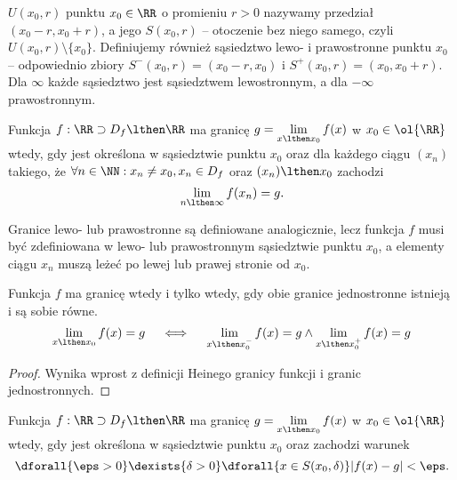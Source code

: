  $U(x_0, r)$ punktu $x_0 \in \RR$ o promieniu $r > 0$ nazywamy przedział $(x_0 - r, x_0 + r)$, a jego  $S(x_0, r)$ -- otoczenie bez niego samego, czyli $U(x_0, r) \setminus \{x_0\}$. Definiujemy również sąsiedztwo lewo- i prawostronne punktu $x_0$ -- odpowiednio zbiory $S^-(x_0, r) = (x_0 - r, x_0)$ i $S^+(x_0, r) = (x_0, x_0 + r)$. Dla $\infty$ każde sąsiedztwo jest sąsiedztwem lewostronnym, a dla $-\infty$ prawostronnym.

\begin{definition}
    Funkcja $f: \RR \supset D_f \lthen \RR$ ma granicę $g = \lim\limits_{x \lthen x_0} f(x)$ w $x_0 \in \ol{\RR}$ wtedy, gdy jest określona w sąsiedztwie punktu $x_0$ oraz dla każdego ciągu $(x_n)$ takiego, że $\forall n \in \NN : x_n \neq x_0, x_n \in D_f$ oraz $(x_n) \lthen x_0$ zachodzi
    \[ \lim_{n\lthen\infty} f(x_n) = g. \]
\end{definition}

Granice lewo- lub prawostronne są definiowane analogicznie, lecz funkcja $f$ musi być zdefiniowana w lewo- lub prawostronnym sąsiedztwie punktu $x_0$, a elementy ciągu $x_n$ muszą leżeć po lewej lub prawej stronie od $x_0$.

\begin{theorem}
    Funkcja $f$ ma granicę wtedy i tylko wtedy, gdy obie granice jednostronne istnieją i są sobie równe.
    \[ \lim_{x \lthen x_0} f(x) = g \quad\iff\quad \lim_{x \lthen x_0^-} f(x) = g \land \lim_{x \lthen x_0^+} f(x) = g \]
\end{theorem}
\begin{proof}
    Wynika wprost z definicji Heinego granicy funkcji i granic jednostronnych.
\end{proof}

\begin{definition}
    \label{d:cauchy_lim}
    Funkcja $f: \RR \supset D_f \lthen \RR$ ma granicę $g = \lim\limits_{x \lthen x_0} f(x)$ w $x_0 \in \ol{\RR}$ wtedy, gdy jest określona w sąsiedztwie punktu $x_0$ oraz zachodzi warunek
    \[ \dforall{\eps > 0} \dexists{\delta > 0} \dforall{x \in S(x_0, \delta)} |f(x) - g| < \eps. \]
\end{definition}

